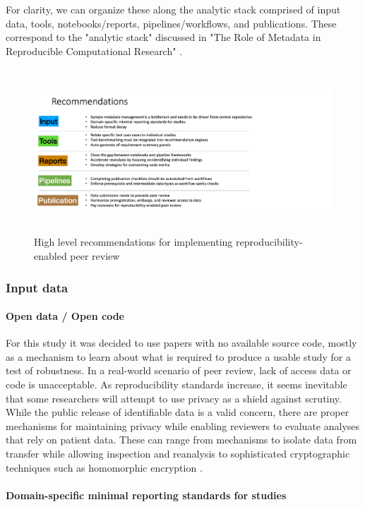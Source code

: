 \documentclass{drexelthesis}
\begin{document}
For clarity, we can organize these along the analytic stack comprised of input data, tools, notebooks/reports, pipelines/workflows, and publications. These correspond to the "analytic stack" discussed in "The Role of Metadata in Reproducible Computational Research" \cite{Leipzig2021-my}.

\begin{figure}[h!]
	\centering
	\includegraphics[width=13.76cm,height=6.15cm]{./images/recos.png}
	\caption{High level recommendations for implementing reproducibility-enabled peer review}
	\label{recos}
\end{figure}

\subsubsection{Input data}

\paragraph{Open data / Open code}

For this study it was decided to use papers with no available source code, mostly as a mechanism to learn about what is required to produce a usable study for a test of robustness. In a real-world scenario of peer review, lack of access data or code is unacceptable. As reproducibility standards increase, it seems inevitable that some researchers will attempt to use privacy as a shield against scrutiny. While the public release of identifiable data is a valid concern, there are proper mechanisms for maintaining privacy while enabling reviewers to evaluate analyses that rely on patient data. These can range from mechanisms to isolate data from transfer while allowing inspection and reanalysis to sophisticated cryptographic techniques such as homomorphic encryption \cite{Gursoy2021-fh}.

\paragraph{Domain-specific minimal reporting standards for studies}
\end{document}
